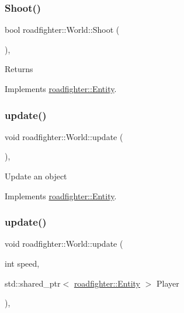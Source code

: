 \subsubsection{\texorpdfstring{Shoot()}{Shoot()}}
{\footnotesize\ttfamily bool roadfighter\+::\+World\+::\+Shoot (\begin{DoxyParamCaption}{ }\end{DoxyParamCaption})\hspace{0.3cm}{\ttfamily [override]}, {\ttfamily [virtual]}}

\begin{DoxyReturn}{Returns}

\end{DoxyReturn}


Implements \hyperlink{classroadfighter_1_1Entity_ad0ecaa0539db252e591da83814251509}{roadfighter\+::\+Entity}.

\mbox{\label{classroadfighter_1_1World_af4988cdad9b54a049de1a29ff87679ec}} 
\subsubsection{\texorpdfstring{update()}{update()}\hspace{0.1cm}{\footnotesize\ttfamily [1/2]}}
{\footnotesize\ttfamily void roadfighter\+::\+World\+::update (\begin{DoxyParamCaption}{ }\end{DoxyParamCaption})\hspace{0.3cm}{\ttfamily [override]}, {\ttfamily [virtual]}}

Update an object 

Implements \hyperlink{classroadfighter_1_1Entity_a19cd353f12a3e8432acd6d5609137561}{roadfighter\+::\+Entity}.

\mbox{\label{classroadfighter_1_1World_a8c26e9cb031b250cdc263623615c1891}} 
\subsubsection{\texorpdfstring{update()}{update()}\hspace{0.1cm}{\footnotesize\ttfamily [2/2]}}
{\footnotesize\ttfamily void roadfighter\+::\+World\+::update (\begin{DoxyParamCaption}\item[{int}]{speed,  }\item[{std\+::shared\+\_\+ptr$<$ \hyperlink{classroadfighter_1_1Entity}{roadfighter\+::\+Entity} $>$}]{Player }\end{DoxyParamCaption})\hspace{0.3cm}{\ttfamily [override]}, {\ttfamily [virtual]}}


